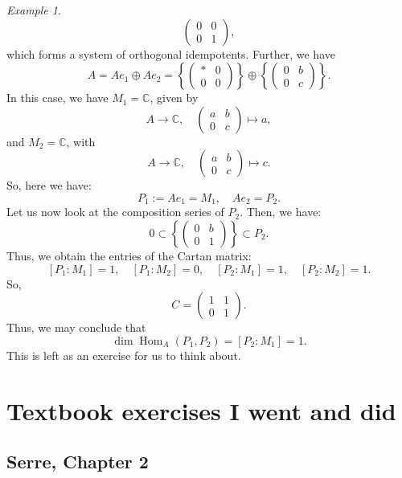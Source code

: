 \documentclass[a4paper]{report}
\theoremstyle{definition}
\theoremstyle{remark}
\theoremstyle{proposition}
\theoremstyle{conjecture}
\theoremstyle{lemma}
\theoremstyle{corollary}
\theoremstyle{exercise}
\theoremstyle{example}
\newtheorem{example}{Example}
\newcommand{\C}{\mathbb{C}}
\newcommand{\on}{\operatorname}
\begin{document}
\begin{example}
$$\begin{pmatrix}
            0 & 0\\
            0 & 1
        \end{pmatrix},$$
        which forms a system of orthogonal idempotents.
        Further, we have $$A = Ae_1 \oplus Ae_2 = \left\lbrace \begin{pmatrix}
                \ast & 0 \\
                0 & 0
                \end{pmatrix}\right\rbrace \oplus \left\lbrace \begin{pmatrix}
                0 & b\\
                0 & c
            \end{pmatrix}\right\rbrace.$$ 
        In this case, we have $M_1 = \C$, given by 
        $$A \longrightarrow \C, \quad \begin{pmatrix}
            a & b\\
            0 & c
        \end{pmatrix} \longmapsto a,$$
        and $M_2 = \C$, with 
        $$A\longrightarrow \C,\quad \begin{pmatrix}
            a&b\\
            0&c
        \end{pmatrix} \longmapsto c.$$
        So, here we have:
        $$P_1 := Ae_1 = M_1, \quad Ae_2 = P_2.$$
        Let us now look at the composition series of $P_2$. Then, we have:
        $$0 \subset \left\lbrace\begin{pmatrix}
                0 & b\\
                0 & 1
            \end{pmatrix}\right\rbrace \subset P_2.$$
        Thus, we obtain the entries of the Cartan matrix:
        $$[P_1:M_1] = 1,\quad [P_1:M_2] = 0,\quad [P_2:M_1] = 1,\quad [P_2:M_2] = 1.$$
        So,
        $$C = \begin{pmatrix}
            1 & 1\\
            0 & 1
        \end{pmatrix}.$$
        Thus, we may conclude that 
        $$\dim \on{Hom}_A(P_1,P_2) = [P_2:M_1] = 1.$$
        This is left as an exercise for us to think about.
\end{example}

\chapter{Textbook exercises I went and did}

\section{Serre, Chapter 2}
\end{document}
